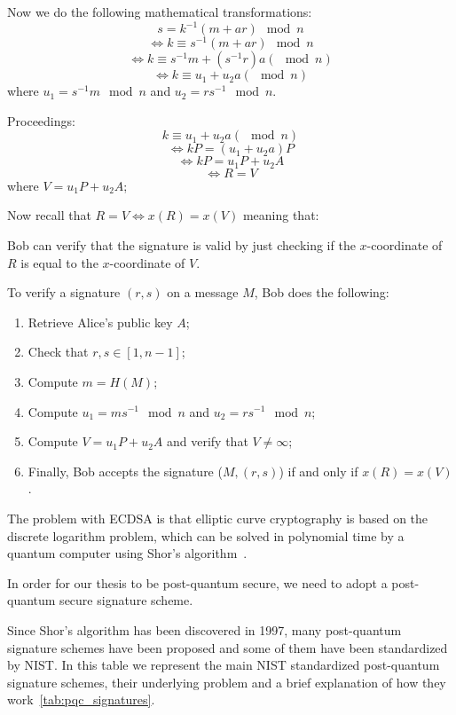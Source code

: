 \documentclass[binding=0.6cm,oneside,noexaminfo]{sapthesis}
\begin{document}
Now we do the following mathematical transformations:
$$s = k^{-1}(m + ar) \mod n$$ $$\iff k \equiv s^{-1}(m + ar) \mod n$$
$$\iff k \equiv s^{-1}m + (s^{-1}r)a (\mod n)$$$$\iff k \equiv u_1 + u_2a (\mod n)$$
where $u_1 = s^{-1}m \mod n$ and $u_2 = rs^{-1} \mod n$. 

Proceedings:$$k \equiv u_1 + u_2a (\mod n)$$
$$\iff kP = (u_1 + u_2a)P$$ $$\iff kP = u_1P + u_2A$$ $$\iff R = V$$ where $V = u_1P + u_2A$;

Now recall that $R = V \iff x(R) = x(V)$ meaning that:

Bob can verify that the signature is valid by just checking
if the $x$-coordinate of $R$ is equal to the $x$-coordinate of $V$.

To verify a signature $(r,s)$ on a message $M$, Bob does the following:

\begin{enumerate}
  \item Retrieve Alice's public key $A$;
  \item Check that $r,s \in [1,n-1]$;
  \item Compute $m = H(M)$;
  \item Compute $u_1 = ms^{-1} \mod n$ and $u_2 = rs^{-1} \mod n$;
  \item Compute $V = u_1P + u_2A$ and verify that $V \neq \infty$;
  \item Finally, Bob accepts the signature ($M,(r,s)$) if and only if $x(R) = x(V)$.
\end{enumerate}

The problem with ECDSA is that elliptic curve cryptography is based on the
discrete logarithm problem, which can be solved in polynomial time by a 
quantum computer using Shor's algorithm~\cite{Shor1997Polynomial}.

In order for our thesis to be post-quantum secure, we need to adopt a 
post-quantum secure signature scheme.

Since Shor's algorithm has been discovered in 1997, many post-quantum
signature schemes have been proposed and some of them have been standardized
by NIST. In this table we represent the main NIST standardized post-quantum 
signature schemes, their underlying problem and a brief explanation of how 
they work~\ref{tab:pqc_signatures}.
\end{document}
